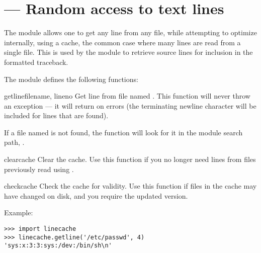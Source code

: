 \section{ ---
         Random access to text lines}



The  module allows one to get any line from any file,
while attempting to optimize internally, using a cache, the common case
where many lines are read from a single file.  This is used by the
 module to retrieve source lines for inclusion in 
the formatted traceback.

The  module defines the following functions:

\begin{funcdesc}{getline}{filename, lineno}
Get line  from file named . This function
will never throw an exception --- it will return  on errors
(the terminating newline character will be included for lines that are
found).

If a file named  is not found, the function will look
for it in the module search path,
.
\end{funcdesc}

\begin{funcdesc}{clearcache}{}
Clear the cache.  Use this function if you no longer need lines from
files previously read using .
\end{funcdesc}

\begin{funcdesc}{checkcache}{}
Check the cache for validity.  Use this function if files in the cache 
may have changed on disk, and you require the updated version.
\end{funcdesc}

Example:

\begin{verbatim}
>>> import linecache
>>> linecache.getline('/etc/passwd', 4)
'sys:x:3:3:sys:/dev:/bin/sh\n'
\end{verbatim}
